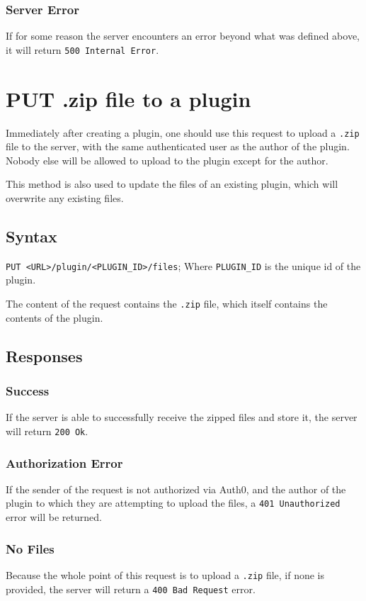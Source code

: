 \documentclass[a4paper, 12pt]{article}
\begin{document}
			\subsubsection{Server Error}
				If for some reason the server encounters an error beyond what was defined above, it will return \verb|500 Internal Error|.

	\section{PUT .zip file to a plugin}
		Immediately after creating a plugin, one should use this request to upload a \verb|.zip| file to the server, with the same authenticated user as the author of the plugin. Nobody else will be allowed to upload to the plugin except for the author.

		This method is also used to update the files of an existing plugin, which will overwrite any existing files.

		\subsection{Syntax}
			\verb|PUT <URL>/plugin/<PLUGIN_ID>/files|; \footnotesize{Where \verb|PLUGIN_ID| is the unique id of the plugin.}

			The content of the request contains the \verb|.zip| file, which itself contains the contents of the plugin.

		\subsection{Responses}
			\subsubsection{Success}
				If the server is able to successfully receive the zipped files and store it, the server will return \verb|200 Ok|.

			\subsubsection{Authorization Error}
				If the sender of the request is not authorized via Auth0, and the author of the plugin to which they are attempting to upload the files, a \verb|401 Unauthorized| error will be returned.

			\subsubsection{No Files}
				Because the whole point of this request is to upload a \verb|.zip| file, if none is provided, the server will return a \verb|400 Bad Request| error.
\end{document}
